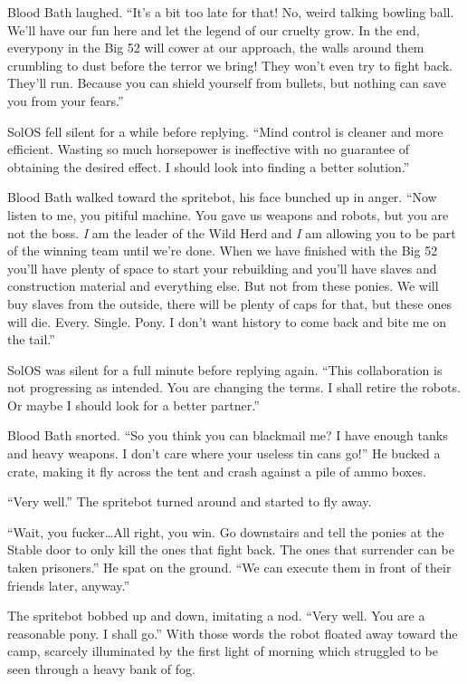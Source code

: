 Blood Bath laughed. ``It's a bit too late for that! No, weird talking bowling ball. We'll have our fun here and let the legend of our cruelty grow. In the end, everypony in the Big 52 will cower at our approach, the walls around them crumbling to dust before the terror we bring! They won't even try to fight back. They'll run. Because you can shield yourself from bullets, but nothing can save you from your fears.''

SolOS fell silent for a while before replying. ``Mind control is cleaner and more efficient. Wasting so much horsepower is ineffective with no guarantee of obtaining the desired effect. I should look into finding a better solution.''

Blood Bath walked toward the spritebot, his face bunched up in anger. ``Now listen to me, you pitiful machine. You gave us weapons and robots, but you are not the boss. \emph{I}\/ am the leader of the Wild Herd and \emph{I}\/ am allowing you to be part of the winning team until we're done. When we have finished with the Big 52 you'll have plenty of space to start your rebuilding and you'll have slaves and construction material and everything else. But not from these ponies. We will buy slaves from the outside, there will be plenty of caps for that, but these ones will die. Every. Single. Pony. I don't want history to come back and bite me on the tail.''

SolOS was silent for a full minute before replying again. ``This collaboration is not progressing as intended. You are changing the terms. I shall retire the robots. Or maybe I should look for a better partner.''

Blood Bath snorted. ``So you think you can blackmail me? I have enough tanks and heavy weapons. I don't care where your useless tin cans go!'' He bucked a crate, making it fly across the tent and crash against a pile of ammo boxes.

``Very well.'' The spritebot turned around and started to fly away.

``Wait, you fucker\dots All right, you win. Go downstairs and tell the ponies at the Stable door to only kill the ones that fight back. The ones that surrender can be taken prisoners.'' He spat on the ground. ``We can execute them in front of their friends later, anyway.''

The spritebot bobbed up and down, imitating a nod. ``Very well. You are a reasonable pony. I shall go.'' With those words the robot floated away toward the camp, scarcely illuminated by the first light of morning which struggled to be seen through a heavy bank of fog.

